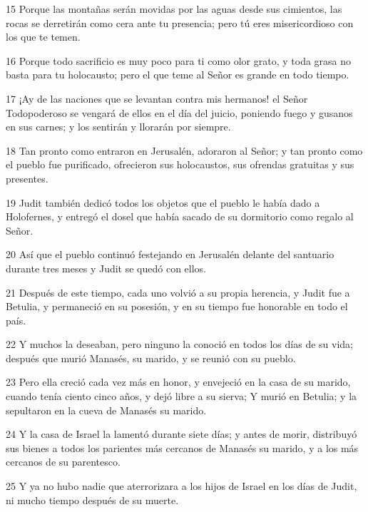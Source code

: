 \par 15 Porque las montañas serán movidas por las aguas desde sus cimientos, las rocas se derretirán como cera ante tu presencia; pero tú eres misericordioso con los que te temen.
\par 16 Porque todo sacrificio es muy poco para ti como olor grato, y toda grasa no basta para tu holocausto; pero el que teme al Señor es grande en todo tiempo.
\par 17 ¡Ay de las naciones que se levantan contra mis hermanos! el Señor Todopoderoso se vengará de ellos en el día del juicio, poniendo fuego y gusanos en sus carnes; y los sentirán y llorarán por siempre.
\par 18 Tan pronto como entraron en Jerusalén, adoraron al Señor; y tan pronto como el pueblo fue purificado, ofrecieron sus holocaustos, sus ofrendas gratuitas y sus presentes.
\par 19 Judit también dedicó todos los objetos que el pueblo le había dado a Holofernes, y entregó el dosel que había sacado de su dormitorio como regalo al Señor.
\par 20 Así que el pueblo continuó festejando en Jerusalén delante del santuario durante tres meses y Judit se quedó con ellos.
\par 21 Después de este tiempo, cada uno volvió a su propia herencia, y Judit fue a Betulia, y permaneció en su posesión, y en su tiempo fue honorable en todo el país.
\par 22 Y muchos la deseaban, pero ninguno la conoció en todos los días de su vida; después que murió Manasés, su marido, y se reunió con su pueblo.
\par 23 Pero ella creció cada vez más en honor, y envejeció en la casa de su marido, cuando tenía ciento cinco años, y dejó libre a su sierva; Y murió en Betulia; y la sepultaron en la cueva de Manasés su marido.
\par 24 Y la casa de Israel la lamentó durante siete días; y antes de morir, distribuyó sus bienes a todos los parientes más cercanos de Manasés su marido, y a los más cercanos de su parentesco.
\par 25 Y ya no hubo nadie que aterrorizara a los hijos de Israel en los días de Judit, ni mucho tiempo después de su muerte.


